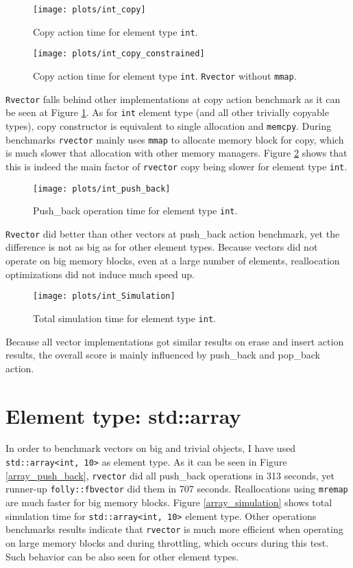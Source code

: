 \documentclass[inz, english, shortabstract]{iithesis}
\begin{document}
\begin{figure}[h!]
\texttt{[image: plots/int\_copy]}
\caption{Copy action time for element type \lstinline{int}.}
\label{int_copy}
\end{figure}

\begin{figure}[h!]
\texttt{[image: plots/int\_copy\_constrained]}
\caption{Copy action time for element type \lstinline{int}. {\tt Rvector} without {\tt mmap}.}
\label{int_copy_constrained}
\end{figure}

{\tt Rvector} falls behind other implementations at copy action benchmark as it can be seen at Figure \ref{int_copy}. As for \lstinline{int} element type (and all other trivially copyable types), copy constructor is equivalent to single allocation and {\tt memcpy}. During benchmarks {\tt rvector} mainly uses {\tt mmap} to allocate memory block for copy, which is much slower that allocation with other memory managers. Figure \ref{int_copy_constrained} shows that this is indeed the main factor of {\tt rvector} copy being slower for element type \lstinline{int}.

\begin{figure}[h!]
\texttt{[image: plots/int\_push\_back]}
\caption{Push\_back operation time for element type \lstinline{int}.}
\label{int_push_back}
\end{figure}

{\tt Rvector} did better than other vectors at push\_back action benchmark, yet the difference is not as big as for other element types. Because vectors did not operate on big memory blocks, even at a large number of elements, reallocation optimizations did not induce much speed up.

\begin{figure}[h!]
\texttt{[image: plots/int\_Simulation]}
\caption{Total simulation time for element type \lstinline{int}.}
\label{int_simulation}
\end{figure}

Because all vector implementations got similar results on erase and insert action results, the overall score is mainly influenced by push\_back and pop\_back action.
\clearpage
\section{Element type: std::array}
In order to benchmark vectors on big and trivial objects, I have used \lstinline{std::array<int, 10>} as element type. As it can be seen in Figure \ref{array_push_back}, {\tt rvector} did all push\_back operations in 313 seconds, yet runner-up {\tt folly::fbvector} did them in 707 seconds. Reallocations using {\tt mremap} are much faster for big memory blocks. Figure \ref{array_simulation} shows total simulation time for \lstinline{std::array<int, 10>} element type. Other operations benchmarks results indicate that {\tt rvector} is much more efficient when operating on large memory blocks and during {throttling}, which occurs during this test. Such behavior can be also seen for other element types.
\end{document}
